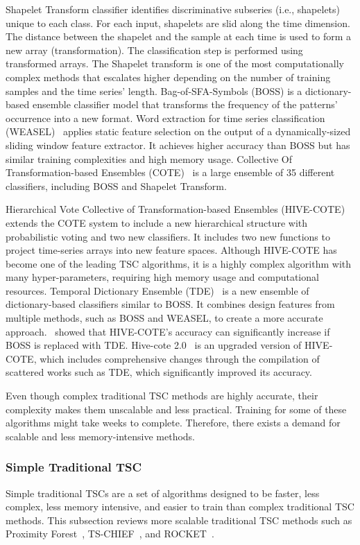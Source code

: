 \documentclass[journal]{IEEEtran}
\begin{document}
Shapelet Transform classifier identifies discriminative subseries (i.e., shapelets)~\cite{bagnall2015time} unique to each class. For each input, shapelets are slid along the time dimension. The distance between the shapelet and the sample at each time is used to form a new array (transformation). The classification step is performed using transformed arrays. The Shapelet transform is one of the most computationally complex methods that escalates higher depending on the number of training samples and the time series’ length. Bag-of-SFA-Symbols (BOSS) is a dictionary-based ensemble classifier model that transforms the frequency of the patterns’ occurrence into a new format. Word extraction for time series classification (WEASEL)~\cite{schafer2017fast} applies static feature selection on the output of a dynamically-sized sliding window feature extractor. It achieves higher accuracy than BOSS but has similar training complexities and high memory usage. Collective Of Transformation-based Ensembles (COTE)~\cite{bagnall2017great} is a large ensemble of 35 different classifiers, including BOSS and Shapelet Transform. 

Hierarchical Vote Collective of Transformation-based Ensembles (HIVE-COTE)~\cite{lines2018time} extends the COTE system to include a new hierarchical structure with probabilistic voting and two new classifiers. It includes two new functions to project time-series arrays into new feature spaces. Although HIVE-COTE has become one of the leading TSC algorithms, it is a highly complex algorithm with many hyper-parameters, requiring high memory usage and computational resources. Temporal Dictionary Ensemble (TDE)~\cite{middlehurst_temporal_2021} is a new ensemble of dictionary-based classifiers similar to BOSS. It combines design features from multiple methods, such as BOSS and WEASEL, to create a more accurate approach.~\cite{middlehurst_temporal_2021} showed that HIVE-COTE’s accuracy can significantly increase if BOSS is replaced with TDE. Hive-cote 2.0~\cite{2021hive} is an upgraded version of HIVE-COTE, which includes comprehensive changes through the compilation of scattered works such as TDE, which significantly improved its accuracy.

Even though complex traditional TSC methods are highly accurate, their complexity makes them unscalable and less practical. Training for some of these algorithms might take weeks to complete. Therefore, there exists a demand for scalable and less memory-intensive methods.


\subsubsection{\textbf{Simple Traditional TSC}}
Simple traditional TSCs are a set of algorithms designed to be faster, less complex, less memory intensive, and easier to train than complex traditional TSC methods.
This subsection reviews more scalable traditional TSC methods such as Proximity Forest~\cite{lucas2019proximity}, TS-CHIEF~\cite{shifaz2019ts}, and ROCKET~\cite{dempster2020rocket}.
\end{document}
